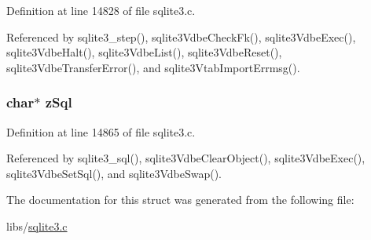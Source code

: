 Definition at line 14828 of file sqlite3.\+c.



Referenced by sqlite3\+\_\+step(), sqlite3\+Vdbe\+Check\+Fk(), sqlite3\+Vdbe\+Exec(), sqlite3\+Vdbe\+Halt(), sqlite3\+Vdbe\+List(), sqlite3\+Vdbe\+Reset(), sqlite3\+Vdbe\+Transfer\+Error(), and sqlite3\+Vtab\+Import\+Errmsg().

\hypertarget{struct_vdbe_a9029984574ab59cf7f6d97570833be55}{}
\subsubsection[{z\+Sql}]{\setlength{\rightskip}{0pt plus 5cm}char$\ast$ z\+Sql}\label{struct_vdbe_a9029984574ab59cf7f6d97570833be55}


Definition at line 14865 of file sqlite3.\+c.



Referenced by sqlite3\+\_\+sql(), sqlite3\+Vdbe\+Clear\+Object(), sqlite3\+Vdbe\+Exec(), sqlite3\+Vdbe\+Set\+Sql(), and sqlite3\+Vdbe\+Swap().



The documentation for this struct was generated from the following file\+:\begin{DoxyCompactItemize}
\item 
libs/\hyperlink{sqlite3_8c}{sqlite3.\+c}\end{DoxyCompactItemize}
